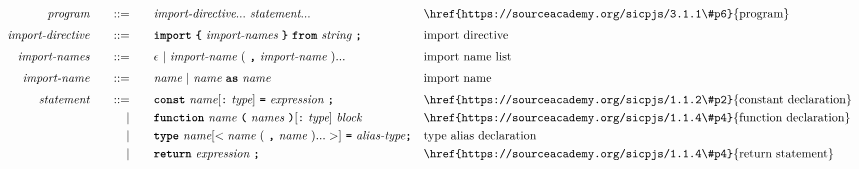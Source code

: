 \begin{alignat*}{9}
&& \textit{program}    &&\quad ::= &\quad && \textit{import-directive} ... \ \textit{statement} ...
                                                           && \textrm{\href{https://sourceacademy.org/sicpjs/3.1.1\#p6}{program}} \\[1mm]
&& \textit{import-directive}    &&\quad ::= &\quad && \textbf{\texttt{import}}\ \textbf{\texttt{\{}}\ \textit{import-names} \ \textbf{\texttt{\}}}\ \textbf{\texttt{from}}\  \textit{string} \ \textbf{\texttt{;}} \quad
                                                           && \textrm{import directive} \\[1mm]
&& \textit{import-names}   && ::= &\quad &&  \epsilon\ | \  \textit{import-name} \ 
                                                   (\ \textbf{\texttt{,}} \ \textit{import-name}\ ) ...
                                                            && \textrm{import name list}   \\[1mm]
&& \textit{import-name}   && ::= &\quad &&  \textit{name}\ | \  \textit{name} \ \textbf{\texttt{as}}\ \textit{name} 
                                                            && \textrm{import name}   \\[1mm]
&& \textit{statement}    &&\quad ::= &\quad && \textbf{\texttt{const}}\  \textit{name}[\texttt{:}\ \textit{type}] \ 
                                           \textbf{\texttt{=}}\  \textit{expression} \ \textbf{\texttt{;}}
                                                           && \textrm{\href{https://sourceacademy.org/sicpjs/1.1.2\#p2}{constant declaration}} \\
&&                       && |   &\quad && \textbf{\texttt{function}}\  \textit{name} \ 
                                   \textbf{\texttt{(}}\  \textit{names} \ \textbf{\texttt{)}}[\texttt{:}\ \textit{type}]\ \textit{block} \quad
                                                           && \textrm{\href{https://sourceacademy.org/sicpjs/1.1.4\#p4}{function declaration}}\\
&&                       && |   &\quad && \textbf{\texttt{type}}\  \textit{name}[<\textit{name}\ (\ \textbf{\texttt{,}} \ \textit{name}\ ) ...>] \ 
                                                           \textbf{\texttt{=}}\  \textit{alias-type} \textbf{\texttt{;}} && \textrm{type alias declaration}\\
&&                       && |   &\quad && \textbf{\texttt{return}}\  \textit{expression} \ \textbf{\texttt{;}}
                                                           && \textrm{\href{https://sourceacademy.org/sicpjs/1.1.4\#p4}{return statement}}\\

\end{alignat*}
